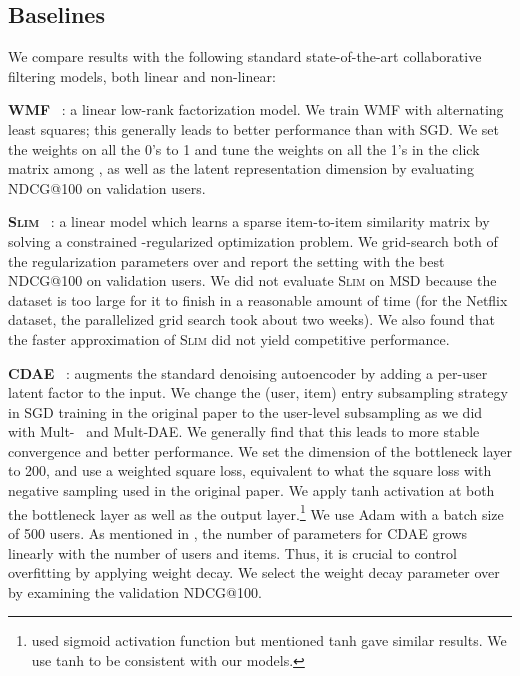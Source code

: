 \documentclass[sigconf]{acmart}
\DeclareRobustCommand{\parhead}[1]{\textbf{#1}~}
\newcommand{\mvae}{{\small Mult-}}
\newcommand{\mdae}{{\small Mult-}\gls{DAE}}
\begin{document}
\subsection{Baselines}
We compare results with the following standard state-of-the-art collaborative filtering models, both linear and non-linear:

\parhead{\Gls{WMF}} \citep{hu2008collaborative}: a linear low-rank factorization model. We train \gls{WMF}
with alternating least squares; this generally leads to
better performance than with SGD. We set the weights on all the 0's to 1 and tune the weights on all the 1's in the click matrix among , as well as the latent representation dimension  by evaluating NDCG@100 on validation users.

\parhead{\textsc{Slim}} \citep{ning2011slim}: a linear model which
learns a sparse item-to-item similarity matrix by solving
a constrained -regularized optimization problem. We grid-search both of the regularization parameters over  and report the setting with the best NDCG@100 on validation users. We did not evaluate \textsc{Slim} on MSD because the dataset is too large for it to finish in a reasonable amount of time (for the Netflix dataset, the parallelized grid search took about two weeks). We also found that the faster approximation of \textsc{Slim} \citep{levy2013efficient} did not yield competitive performance. 

\parhead{\Gls{CDAE}} \citep{wu2016collaborative}: augments the standard denoising autoencoder by adding a per-user latent factor to the input. We change the (user, item) entry subsampling strategy in SGD training in the original paper to the user-level subsampling as we did with \mvae~ and \mdae. We generally find that this leads to more stable convergence and better performance. We set the dimension of the bottleneck layer to 200, and use a weighted square loss, equivalent to what the square loss with negative sampling used in the original paper. We apply tanh activation at both the bottleneck layer as well as the output layer.\footnote{\citet{wu2016collaborative} used sigmoid activation function but mentioned tanh gave similar results. We use tanh to be consistent with our models.} We use Adam with a batch size of 500 users. As mentioned in , the number of parameters for \gls{CDAE} grows linearly with the number of users and items. Thus, it is crucial to control overfitting by applying weight decay. We select the weight decay parameter over  by examining the validation NDCG@100. 
\end{document}
